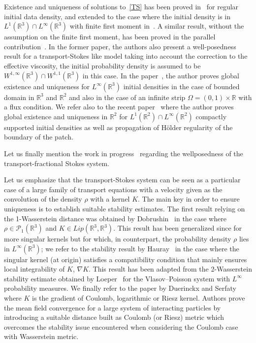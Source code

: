 \documentclass[10pt]{amsart}
\theoremstyle{definition}\newtheorem{defi}[theo]{Definition}\newtheorem{rema}[theo]{Remark}\newtheorem{exam}[theo]{Example}\newtheorem{exem}[theo]{Example}\newtheorem{nota}[theo]{Notation}
\newcommand{\R}{\mathbb{R}}
\newcommand{\clP}{\mathcal{P}}
\begin{document}
Existence and uniqueness of solutions to~\eqref{TS} has been proved in~\cite{Hofer} for regular initial data density, and extended to the case where the initial density is in $L^1(\R^3) \cap L^\infty(\R^3)$ with finite first moment in~\cite{Mecherbet2}. A similar result, without the assumption on the finite first moment, has been proved in the parallel contribution~\cite{Hofer&Schubert}. In the former paper, the authors also present a well-posedness result for a transport-Stokes like model taking into account the correction to the effective viscosity, the initial probability density is assumed to be $W^{1,\infty}(\R^3)\cap W^{1,1}(\R^3) $ in this case. In the paper~\cite{Leblond}, the author proves global existence and uniqueness for $L^\infty(\R^3)$ initial densities in the case of bounded domain in $\R^3$ and $\R^2$ and also in the case of an infinite strip $\Omega= (0,1)\times \R$ with a flux condition. We refer also to the recent paper~\cite{GrayerII} where the author proves global existence and uniqueness in $\R^2$ for $L^1(\R^2)\cap L^\infty(\R^2)$ compactly supported initial densities as well as propagation of H\"older regularity of the boundary of the patch.


Let us finally mention the work in progress~\cite{Cobb} regarding the wellposedness of the transport-fractional Stokes system.

Let us emphasize that the transport-Stokes system can be seen as a particular case of a large family of transport equations with a velocity given as the convolution of the density $\rho$ with a kernel $K$. The main key in order to ensure uniqueness is to establish suitable stability estimates. The first result relying on the 1-Wasserstein distance was obtained by Dobrushin~\cite{Dobrushin} in the case where $\rho \in \clP_1(\R^3)$ and $K\in Lip(\R^3,\R^3)$. This result has been generalized since for more singular kernels but for which, in counterpart, the probability density $\rho$ lies in $L^\infty(\R^3)$; we refer to the stability result by Hauray~\cite{Hauray} in the case where the singular kernel (at origin) satisfies a compatibility condition that mainly ensures local integrability of $K$, $\nabla K$. This result has been adapted from the 2-Wasserstein stability estimate obtained by Loeper~\cite{Loeper} for the Vlasov--Poisson system with $L^\infty$ probability measures. We finally refer to the paper by Duerinckx and Serfaty~\cite{Serfaty&Duerinckx} where $K$ is the gradient of Coulomb, logarithmic or Riesz kernel. Authors prove the mean field convergence for a large system of interacting particles by introducing a suitable distance built as Coulomb (or Riesz) metric which overcomes the stability issue encountered when considering the Coulomb case with Wasserstein metric.
\end{document}
